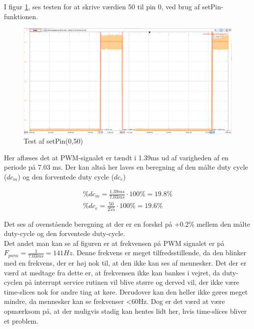\documentclass[Modultest/Modultest_main.tex]{subfiles}
\begin{document}
I figur \ref{fig:test_50_pin_0}, ses testen for at skrive værdien 50 til pin 0, ved brug af setPin-funktionen. 
\begin{figure}[H]
    \centering
    \includegraphics[width=\textwidth]{Modultest/CupLight/graphics/pwm_50.png}
    \caption{Test af setPin(0,50)}
    \label{fig:test_50_pin_0}
\end{figure}
Her aflæses det at PWM-signalet er tændt i 1.39ms ud af varigheden af en periode på  7.03 ms. Der kan altså her laves en beregning af den målte duty cycle ($dc_m$) og den forventede duty cycle ($dc_e$)
\begin{subequation}
\begin{align}
    \%dc_m=\frac{1.39ms}{7.03ms}\cdot 100\% = 19.8\%
    \\\%dc_e=\frac{50}{255}\cdot 100\% = 19.6\%
\end{align}
\end{subequation}
Det ses af ovenstående beregning at der er en forskel på +0.2\%  mellem den målte duty-cycle og den forventede duty-cycle.
\\Det andet man kan se af figuren er at frekvensen på PWM signalet er på $F_{pwm}=\frac{1}{7.03ms}=141Hz$. Denne frekvens er meget tilfredsstillende, da den blinker med en frekvens, der er høj nok til, at den ikke kan ses af mennesker. Det der er værd at medtage fra dette er, at frekvensen ikke kan bankes i vejret, da duty-cyclen på interrupt service rutinen vil blive større og derved vil, der ikke være time-slices nok for andre ting at køre. Derudover kan den heller ikke gøres meget mindre, da mennesker kan se frekvenser <60Hz. Dog er det værd at være opmærksom på, at der muligvis stadig kan hentes lidt her, hvis time-slices bliver et problem.
\end{document}
